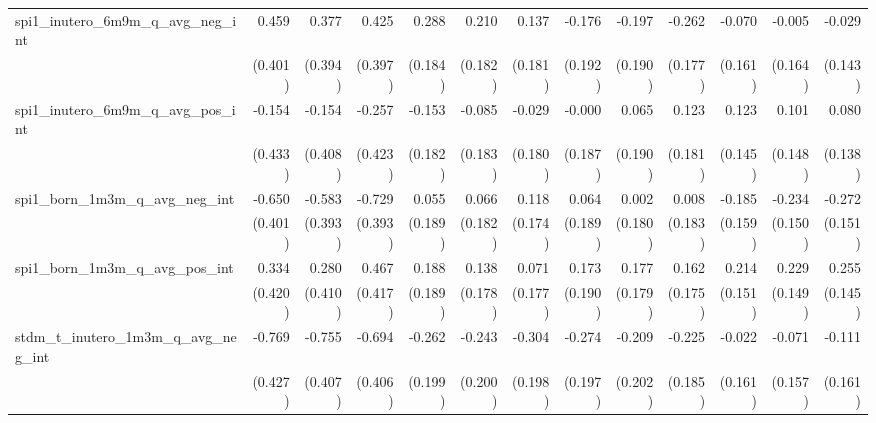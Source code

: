 \begin{tabular}{lrrrrrrrrrrrr}
spi1\_inutero\_6m9m\_q\_avg\_neg\_int       &        0.459 &        0.377 &        0.425 &        0.288 &        0.210 &        0.137 &       -0.176 &       -0.197 &       -0.262 &       -0.070 &       -0.005 &       -0.029 \\ 
                                            &      (0.401) &      (0.394) &      (0.397) &      (0.184) &      (0.182) &      (0.181) &      (0.192) &      (0.190) &      (0.177) &      (0.161) &      (0.164) &      (0.143) \\ 
spi1\_inutero\_6m9m\_q\_avg\_pos\_int       &       -0.154 &       -0.154 &       -0.257 &       -0.153 &       -0.085 &       -0.029 &       -0.000 &        0.065 &        0.123 &        0.123 &        0.101 &        0.080 \\ 
                                            &      (0.433) &      (0.408) &      (0.423) &      (0.182) &      (0.183) &      (0.180) &      (0.187) &      (0.190) &      (0.181) &      (0.145) &      (0.148) &      (0.138) \\ 
spi1\_born\_1m3m\_q\_avg\_neg\_int          &       -0.650 &       -0.583 &       -0.729 &        0.055 &        0.066 &        0.118 &        0.064 &        0.002 &        0.008 &       -0.185 &       -0.234 &       -0.272 \\ 
                                            &      (0.401) &      (0.393) &      (0.393) &      (0.189) &      (0.182) &      (0.174) &      (0.189) &      (0.180) &      (0.183) &      (0.159) &      (0.150) &      (0.151) \\ 
spi1\_born\_1m3m\_q\_avg\_pos\_int          &        0.334 &        0.280 &        0.467 &        0.188 &        0.138 &        0.071 &        0.173 &        0.177 &        0.162 &        0.214 &        0.229 &        0.255 \\ 
                                            &      (0.420) &      (0.410) &      (0.417) &      (0.189) &      (0.178) &      (0.177) &      (0.190) &      (0.179) &      (0.175) &      (0.151) &      (0.149) &      (0.145) \\ 
stdm\_t\_inutero\_1m3m\_q\_avg\_neg\_int    &       -0.769 &       -0.755 &       -0.694 &       -0.262 &       -0.243 &       -0.304 &       -0.274 &       -0.209 &       -0.225 &       -0.022 &       -0.071 &       -0.111 \\ 
                                            &      (0.427) &      (0.407) &      (0.406) &      (0.199) &      (0.200) &      (0.198) &      (0.197) &      (0.202) &      (0.185) &      (0.161) &      (0.157) &      (0.161) \\ 

\end{tabular}
